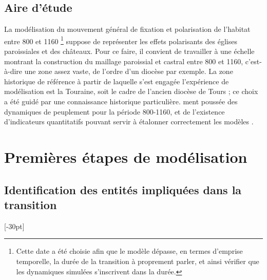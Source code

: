 \subsection{Aire d'étude}	

La modélisation du mouvement général de fixation et polarisation de l'habitat entre 800 et 1160 \footnote{
	Cette date a été choisie afin que le modèle dépasse, en termes d’emprise temporelle, la durée de la transition à proprement parler, et ainsi vérifier que les dynamiques simulées s’inscrivent dans la durée.
} suppose de représenter les effets polarisants des églises paroissiales et des châteaux.
Pour ce faire, il convient de travailler à une échelle montrant la construction du maillage paroissial et castral entre 800 et 1160, c'est-à-dire une zone assez vaste, de l'ordre d'un diocèse par exemple.
La zone historique de référence à partir de laquelle s'est engagée l'expérience de modélisation est la Touraine, soit le cadre de l'ancien diocèse de Tours ; ce choix a été guidé par une connaissance historique particulière.
ment poussée des dynamiques de peuplement pour la période 800-1160, et de l'existence d'indicateurs quantitatifs pouvant servir à étalonner correctement les modèles \autocite{zadora-rio_paroisses_2008}.

\section{Premières étapes de modélisation}

\subsection{Identification des entités impliquées dans la transition}[-30pt]


